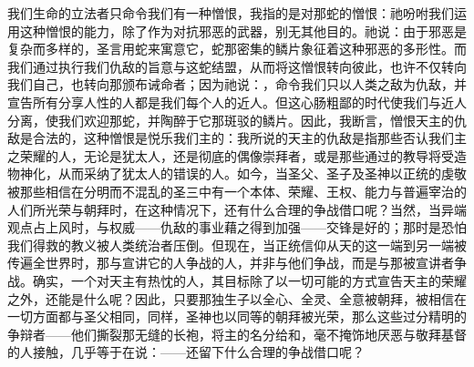 我们生命的立法者只命令我们有一种憎恨，我指的是对那蛇的憎恨：祂吩咐我们运用这种憎恨的能力，除了作为对抗邪恶的武器，别无其他目的。祂说：由于邪恶是复杂而多样的，圣言用蛇来寓意它，蛇那密集的鳞片象征着这种邪恶的多形性。而我们通过执行我们仇敌的旨意与这蛇结盟，从而将这憎恨转向彼此，也许不仅转向我们自己，也转向那颁布诫命者；因为祂说：，命令我们只以人类之敌为仇敌，并宣告所有分享人性的人都是我们每个人的近人。但这心肠粗鄙的时代使我们与近人分离，使我们欢迎那蛇，并陶醉于它那斑驳的鳞片。因此，我断言，憎恨天主的仇敌是合法的，这种憎恨是悦乐我们主的：我所说的天主的仇敌是指那些否认我们主之荣耀的人，无论是犹太人，还是彻底的偶像崇拜者，或是那些通过的教导将受造物神化，从而采纳了犹太人的错误的人。如今，当圣父、圣子及圣神以正统的虔敬被那些相信在分明而不混乱的圣三中有一个本体、荣耀、王权、能力与普遍宰治的人们所光荣与朝拜时，在这种情况下，还有什么合理的争战借口呢？当然，当异端观点占上风时，与权威——仇敌的事业藉之得到加强——交锋是好的；那时是恐怕我们得救的教义被人类统治者压倒。但现在，当正统信仰从天的这一端到另一端被传遍全世界时，那与宣讲它的人争战的人，并非与他们争战，而是与那被宣讲者争战。确实，一个对天主有热忱的人，其目标除了以一切可能的方式宣告天主的荣耀之外，还能是什么呢？因此，只要那独生子以全心、全灵、全意被朝拜，被相信在一切方面都与圣父相同，同样，圣神也以同等的朝拜被光荣，那么这些过分精明的争辩者——他们撕裂那无缝的长袍，将主的名分给和，毫不掩饰地厌恶与敬拜基督的人接触，几乎等于在说：——还留下什么合理的争战借口呢？\par

